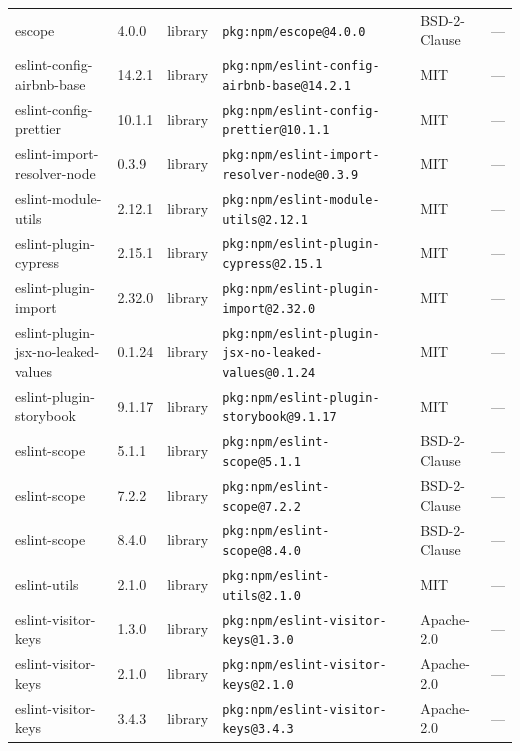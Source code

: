 \documentclass[11pt,a4paper]{article}
\begin{document}
\begin{longtable}{|p{4cm}|p{2cm}|p{1.6cm}|p{5cm}|p{1.5cm}|p{3.5cm}|}
\raggedright escope & 4.0.0 & library & \small\texttt{pkg:npm/escope@4.0.0} & BSD-2-Clause & \small — \\
\raggedright eslint-config-airbnb-base & 14.2.1 & library & \small\texttt{pkg:npm/eslint-config-airbnb-base@14.2.1} & MIT & \small — \\
\raggedright eslint-config-prettier & 10.1.1 & library & \small\texttt{pkg:npm/eslint-config-prettier@10.1.1} & MIT & \small — \\
\raggedright eslint-import-resolver-node & 0.3.9 & library & \small\texttt{pkg:npm/eslint-import-resolver-node@0.3.9} & MIT & \small — \\
\raggedright eslint-module-utils & 2.12.1 & library & \small\texttt{pkg:npm/eslint-module-utils@2.12.1} & MIT & \small — \\
\raggedright eslint-plugin-cypress & 2.15.1 & library & \small\texttt{pkg:npm/eslint-plugin-cypress@2.15.1} & MIT & \small — \\
\raggedright eslint-plugin-import & 2.32.0 & library & \small\texttt{pkg:npm/eslint-plugin-import@2.32.0} & MIT & \small — \\
\raggedright eslint-plugin-jsx-no-leaked-values & 0.1.24 & library & \small\texttt{pkg:npm/eslint-plugin-jsx-no-leaked-values@0.1.24} & MIT & \small — \\
\raggedright eslint-plugin-storybook & 9.1.17 & library & \small\texttt{pkg:npm/eslint-plugin-storybook@9.1.17} & MIT & \small — \\
\raggedright eslint-scope & 5.1.1 & library & \small\texttt{pkg:npm/eslint-scope@5.1.1} & BSD-2-Clause & \small — \\
\raggedright eslint-scope & 7.2.2 & library & \small\texttt{pkg:npm/eslint-scope@7.2.2} & BSD-2-Clause & \small — \\
\raggedright eslint-scope & 8.4.0 & library & \small\texttt{pkg:npm/eslint-scope@8.4.0} & BSD-2-Clause & \small — \\
\raggedright eslint-utils & 2.1.0 & library & \small\texttt{pkg:npm/eslint-utils@2.1.0} & MIT & \small — \\
\raggedright eslint-visitor-keys & 1.3.0 & library & \small\texttt{pkg:npm/eslint-visitor-keys@1.3.0} & Apache-2.0 & \small — \\
\raggedright eslint-visitor-keys & 2.1.0 & library & \small\texttt{pkg:npm/eslint-visitor-keys@2.1.0} & Apache-2.0 & \small — \\
\raggedright eslint-visitor-keys & 3.4.3 & library & \small\texttt{pkg:npm/eslint-visitor-keys@3.4.3} & Apache-2.0 & \small — \\

\end{longtable}
\end{document}
